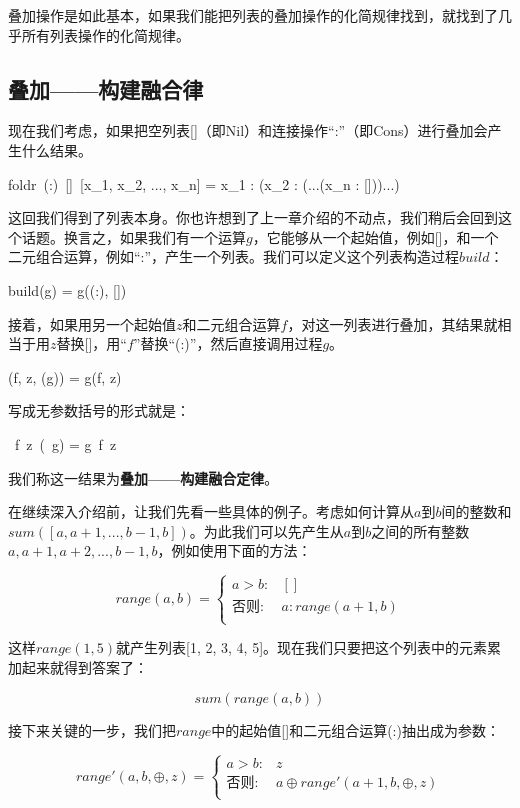 \documentclass{article}
\begin{document}
叠加操作是如此基本，如果我们能把列表的叠加操作的化简规律找到，就找到了几乎所有列表操作的化简规律。

\subsection{叠加——构建融合律}
现在我们考虑，如果把空列表[]（即Nil）和连接操作“:”（即Cons）进行叠加会产生什么结果。

\be
foldr\ (:)\ []\ [x_1, x_2, ..., x_n] = x_1 : (x_2 : (...(x_n : []))...)
\label{eq:foldr-fixed-point}
\ee

这回我们得到了列表本身。你也许想到了上一章介绍的不动点，我们稍后会回到这个话题。换言之，如果我们有一个运算$g$，它能够从一个起始值，例如[]，和一个二元组合运算，例如“:”，产生一个列表。我们可以定义这个列表构造过程$build$：

\be
build(g) = g((:), [])
\label{eq:build-definition}
\ee

接着，如果用另一个起始值$z$和二元组合运算$f$，对这一列表进行叠加，其结果就相当于用$z$替换[]，用“$f$”替换“(:)”，然后直接调用过程$g$。

\be
{}(f, z, (g)) = g(f, z)
\ee

写成无参数括号的形式就是：

\be
{}\ f\ z\ (\ g) = g\ f\ z
\label{eq:foldr-build-fusion-law}
\ee

我们称这一结果为\textbf{叠加——构建融合定律}。

在继续深入介绍前，让我们先看一些具体的例子。考虑如何计算从$a$到$b$间的整数和$sum([a, a+1, ..., b-1, b])$。为此我们可以先产生从$a$到$b$之间的所有整数$a, a+1, a+2, ..., b-1, b$，例如使用下面的方法：

\[
range(a, b) =
\begin{cases}
a > b: & [] \\
\text{否则}: & a : range(a+1, b) \\
\end{cases}
\]

这样$range(1, 5)$就产生列表[1, 2, 3, 4, 5]。现在我们只要把这个列表中的元素累加起来就得到答案了：

\[
sum(range(a, b))
\]

接下来关键的一步，我们把$range$中的起始值[]和二元组合运算(:)抽出成为参数：

\[
range'(a, b, \oplus, z) =
  \begin{cases}
  a > b: & z \\
  \text{否则}: & a \oplus range'(a+1, b, \oplus, z) \\
  \end{cases}
\]
\end{document}
